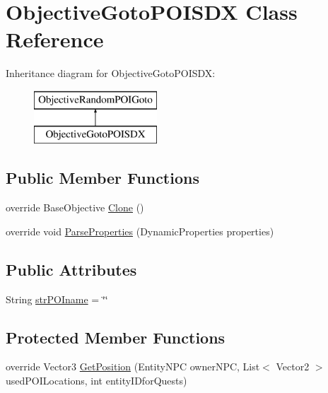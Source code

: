 \hypertarget{class_objective_goto_p_o_i_s_d_x}{}\section{Objective\+Goto\+P\+O\+I\+S\+DX Class Reference}
\label{class_objective_goto_p_o_i_s_d_x}
Inheritance diagram for Objective\+Goto\+P\+O\+I\+S\+DX\+:\begin{figure}[H]
\begin{center}
\leavevmode
\includegraphics[height=2.000000cm]{class_objective_goto_p_o_i_s_d_x}
\end{center}
\end{figure}
\subsection*{Public Member Functions}
\begin{DoxyCompactItemize}
\item 
override Base\+Objective \mbox{\hyperlink{class_objective_goto_p_o_i_s_d_x_aab74c80adfb026d8cc2ddd2cffeb5266}{Clone}} ()
\item 
override void \mbox{\hyperlink{class_objective_goto_p_o_i_s_d_x_a0e2352c53d7fb7ca6759cc65086fdac4}{Parse\+Properties}} (Dynamic\+Properties properties)
\end{DoxyCompactItemize}
\subsection*{Public Attributes}
\begin{DoxyCompactItemize}
\item 
String \mbox{\hyperlink{class_objective_goto_p_o_i_s_d_x_a3b90272b61bebff67a810abc96172212}{str\+P\+O\+Iname}} = \char`\"{}\char`\"{}
\end{DoxyCompactItemize}
\subsection*{Protected Member Functions}
\begin{DoxyCompactItemize}
\item 
override Vector3 \mbox{\hyperlink{class_objective_goto_p_o_i_s_d_x_a00a64fdf46014806e613fa91f9f2388e}{Get\+Position}} (Entity\+N\+PC owner\+N\+PC, List$<$ Vector2 $>$ used\+P\+O\+I\+Locations, int entity\+I\+Dfor\+Quests)
\end{DoxyCompactItemize}
